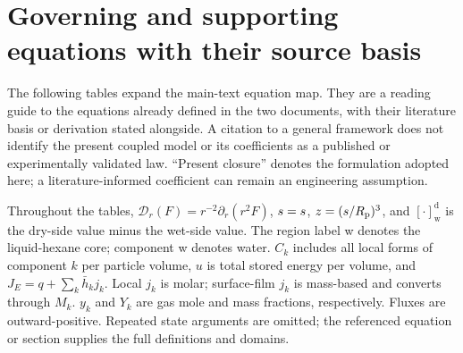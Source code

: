\section{Governing and supporting equations with their source basis}
\label{sup:equations}
The following tables expand the main-text equation map. They are a reading
guide to the equations already defined in the two documents, with their
literature basis or derivation stated alongside. A citation to a general
framework does not identify the present coupled model or its coefficients
as a published or experimentally validated law. ``Present closure'' denotes
the formulation adopted here; a literature-informed coefficient can remain
an engineering assumption.

Throughout the tables, $\mathcal D_r(F)=r^{-2}\partial_r(r^2F)$,
$s=s$, $z=(s/R_{\mathrm{p}})^3$, and $[\cdot]_{\mathrm w}^{\mathrm d}$ is the
dry-side value minus the wet-side value. The region label w denotes the
liquid-hexane core; component w denotes water. $C_k$ includes all local
forms of component $k$ per particle volume, $u$ is total stored energy
per volume, and $J_E=q+\sum_k\bar h_kj_k$. Local $j_k$ is molar;
surface-film $j_k$ is mass-based and converts through $M_k$.
$y_k$ and $Y_k$ are gas mole and mass fractions, respectively.
Fluxes are outward-positive. Repeated state arguments are omitted;
the referenced equation or section supplies the full definitions and domains.

